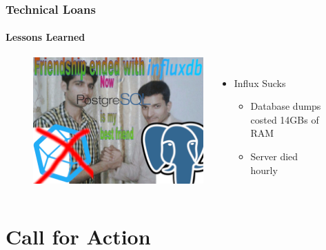 \documentclass[aspectratio=169]{beamer}
\begin{document}
\begin{frame}
  \frametitle{Technical Loans}
  \framesubtitle{Lessons Learned}

\begin{figure}
\begin{columns}
\begin{center}
\includegraphics[height=0.65\textheight]{figs/meme_postgres_influx.png}
\end{center}
\raggedright
\vspace{0.5cm}

\begin{itemize}
  \item Influx Sucks
        \begin{itemize}
          \item Database dumps costed 14GBs of RAM
          \item Server died hourly
        \end{itemize}
  \end{itemize}


\end{columns}
\end{figure}

\end{frame}



\section{Call for Action}

\end{document}
